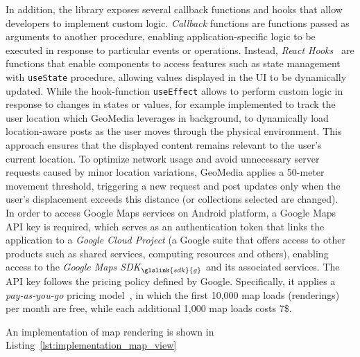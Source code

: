 In addition, the library exposes several callback functions and hooks that allow developers to implement custom logic. \textit{Callback} functions are functions passed as arguments to another procedure, enabling application-specific logic to be executed in response to particular events or operations. Instead, \textit{React Hooks}~\cite{site:react-hook} are functions that enable components to access features such as state management with \texttt{useState} procedure, allowing values displayed in the UI to be dynamically updated. While the hook-function \texttt{useEffect} allows to perform custom logic in response to changes in states or values, for example implemented to track the user location which GeoMedia leverages in background, to dynamically load location-aware posts as the user moves through the physical environment. This approach ensures that the displayed content remains relevant to the user's current location. To optimize network usage and avoid unnecessary server requests caused by minor location variations, GeoMedia applies a 50-meter movement threshold, triggering a new request and post updates only when the user's displacement exceeds this distance (or collections selected are changed).\\
In order to access Google Maps services on Android platform, a Google Maps API key is required, which serves as an authentication token that links the application to a \textit{Google Cloud Project} (a Google suite that offers access to other products such as shared services, computing resources and others), enabling access to the \textit{Google Maps SDK}$_{\glslink{sdk}{g}}$ and its associated services. The API key follows the pricing policy defined by Google. Specifically, it applies a \textit{pay-as-you-go} pricing model~\cite{site:gmaps-pricing}, in which the first 10,000 map loads (renderings) per month are free, while each additional 1,000 map loads costs 7\$. 

An implementation of map rendering is shown in Listing~\ref{lst:implementation_map_view} 
\newpage

